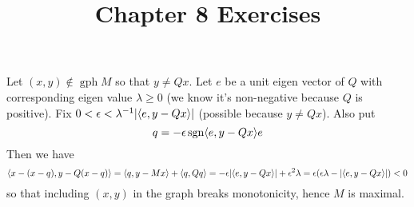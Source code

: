 \documentclass{article}
\title{Chapter 8 Exercises}
\newenvironment{ex}[1]
  {\renewcommand\theexercise{#1}\exercise}
  {\endexercise}
\DeclareMathOperator*{\gph}{gph}
\DeclareMathOperator*{\sgn}{sgn}
\begin{document}
\begin{ex}{8.5} %
  Let $(x, y) \not\in \gph M$ so that $y \ne Qx$. Let $e$ be a unit eigen vector of $Q$ with corresponding eigen value $\lambda \ge 0$ (we know it's non-negative because $Q$ is positive). Fix $0 < \epsilon < \lambda^{-1} \lvert\langle e, y-Qx\rangle\rvert$ (possible because $y \ne Qx$). Also put
  $$
  q = -\epsilon \sgn \iprod{e}{y - Qx} e
  $$
  Then we have
  $$
  \langle x - (x - q), y - Q(x - q)\rangle = \langle q, y - Mx\rangle + \langle q, Qq\rangle = -\epsilon \lvert\langle e, y - Qx\rangle\rvert + \epsilon^2 \lambda = \epsilon ( \epsilon \lambda - \lvert\langle e, y - Qx\rangle\rvert ) < 0
  $$
  so that including $(x, y)$ in the graph breaks monotonicity, hence $M$ is maximal.
\end{ex} %
\begin{ex}{8.11} %
\end{ex} %
\begin{ex}{8.12} %
\end{ex} %
\begin{ex}{8.16} %
\end{ex} %
\begin{ex}{8.18} %
\end{ex} %
\begin{ex}{8.19} %
\end{ex} %
\begin{ex}{8.20} %
\end{ex} %
\begin{ex}{8.22} %
\end{ex} %
\begin{ex}{8.24} %
\end{ex} %
\begin{ex}{8.25} %
\end{ex} %
\begin{ex}{8.26} %
\end{ex} %
\begin{ex}{8.27} %
\end{ex} %
\end{document}
